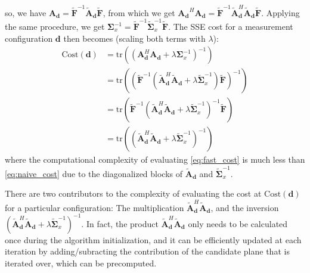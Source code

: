 \documentclass{article}
\begin{document}
so, we have $\bm{A_d} = \widetilde{\bm F}^{-1} \widetilde{\bm A}_{\bm d}
\widetilde{\bm F}$, from which we get $\bm{A_d}^H \bm{A_d} = \widetilde{\bm
F}^{-1} \widetilde{\bm A}_{\bm d}^H \widetilde{\bm A}_{\bm d} \widetilde{\bm
F}$. Applying the same procedure, we get $\bm \Sigma_x^{-1} =
\widetilde{\bm F}^{-1} \widetilde{\bm \Sigma}_x^{-1} \widetilde{\bm F}$.
The SSE cost for a measurement configuration $\bm d$ then becomes (scaling both terms
with $\lambda$):
\begin{align}
\text{Cost}(\bm{d}) & = \text{tr}\left(\left( {\bm A}_{\bm d}^H {\bm A}_{\bm d} +
\lambda \bm \Sigma_x^{-1} \right)^{-1} \right)
\label{eq:naive_cost}\\
& = \text{tr}\left(\left(\widetilde{\bm F}^{-1} \left( \widetilde{\bm A}_{\bm d}^H
\widetilde{\bm A}_{\bm d} + \lambda \widetilde{\bm \Sigma}_x^{-1} \right)
\widetilde{\bm F}\right)^{-1}\right) \nonumber \\
& = \text{tr}\left(\widetilde{\bm F}^{-1} \left( \widetilde{\bm A}_{\bm d}^H
\widetilde{\bm A}_{\bm d} + \lambda \widetilde{\bm \Sigma}_x^{-1} \right)^{-1}
\widetilde{\bm F}\right) \nonumber \\
& = \text{tr}\left(\left( \widetilde{\bm A}_{\bm d}^H \widetilde{\bm A}_{\bm d} +
\lambda \widetilde{\bm \Sigma}_x^{-1} \right)^{-1} \right)
\label{eq:fast_cost}
\end{align}
where the computational complexity of evaluating \eqref{eq:fast_cost} is much
less than \eqref{eq:naive_cost} due to the diagonalized blocks of
$\widetilde{\bm A}_{\bm d}$ and $\widetilde{\bm \Sigma}_x^{-1}$.

There are two contributors to the complexity of evaluating the cost at
$\text{Cost}(\bm{d})$ for a particular configuration: The multiplication
$\widetilde{\bm A}_{\bm d}^H \widetilde{\bm A}_{\bm d}$, and the inversion
$\left( \widetilde{\bm A}_{\bm d}^H \widetilde{\bm A}_{\bm d} + \lambda
\widetilde{\bm \Sigma}_x^{-1} \right)^{-1}$. In fact, the product
$\widetilde{\bm A}_{\bm d}^H \widetilde{\bm A}_{\bm d}$ only needs to be
calculated once during the algorithm initialization, and it can be efficiently
updated at each iteration by adding/subracting the contribution of the candidate plane
that is iterated over, which can be precomputed.
\end{document}
